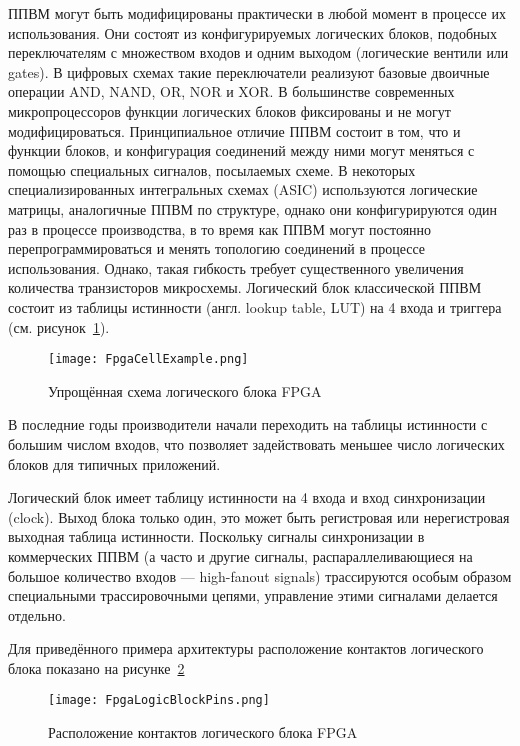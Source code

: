 ППВМ могут быть модифицированы практически в любой момент в процессе их использования. Они состоят из конфигурируемых логических блоков, подобных переключателям с множеством входов и одним выходом (логические вентили или \foreignlanguage{english}{gates}). В цифровых схемах такие переключатели реализуют базовые двоичные операции AND, NAND, OR, NOR и XOR. В большинстве современных микропроцессоров функции логических блоков фиксированы и не могут модифицироваться. Принципиальное отличие ППВМ состоит в том, что и функции блоков, и конфигурация соединений между ними могут меняться с помощью специальных сигналов, посылаемых схеме. В некоторых специализированных интегральных схемах (ASIC) используются логические матрицы, аналогичные ППВМ по структуре, однако они конфигурируются один раз в процессе производства, в то время как ППВМ могут постоянно перепрограммироваться и менять топологию соединений в процессе использования. Однако, такая гибкость требует существенного увеличения количества транзисторов микросхемы.
Логический блок классической ППВМ состоит из таблицы истинности (англ. \foreignlanguage{english}{lookup table, LUT}) на 4 входа и триггера~\cite{Wiki_FPGA} (см. рисунок~\ref{fig:FpgaCellExample}).

\begin{figure}[ht]
	\centering
	\texttt{[image: FpgaCellExample.png]}  
	\caption{Упрощённая схема логического блока FPGA}
	\label{fig:FpgaCellExample}
\end{figure}
 
В последние годы производители начали переходить на таблицы истинности с большим числом входов, что позволяет задействовать меньшее число логических блоков для типичных приложений.

Логический блок имеет таблицу истинности на 4 входа и вход синхронизации (\foreignlanguage{english}{clock}). Выход блока только один, это может быть регистровая или нерегистровая выходная таблица истинности. Поскольку сигналы синхронизации в коммерческих ППВМ (а часто и другие сигналы, распараллеливающиеся на большое количество входов — \foreignlanguage{english}{high-fanout signals}) трассируются особым образом специальными трассировочными цепями, управление этими сигналами делается отдельно.

Для приведённого примера архитектуры расположение контактов логического блока показано на рисунке~\ref{fig:FpgaLogicBlockPins}~\cite{Wiki_FPGA}

\begin{figure}[ht]
	\centering
	\texttt{[image: FpgaLogicBlockPins.png]}  
	\caption{Расположение контактов логического блока FPGA}
	\label{fig:FpgaLogicBlockPins}
\end{figure}

